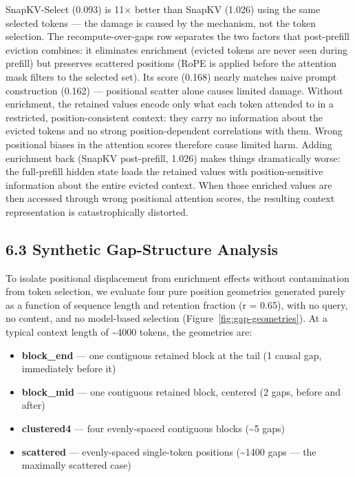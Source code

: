 \documentclass[10pt,letterpaper]{article}
\providecommand{\tightlist}{%
  \setlength{\itemsep}{0pt}\setlength{\parskip}{0pt}}
\begin{document}
SnapKV-Select (0.093) is 11× better than SnapKV (1.026) using the same
selected tokens --- the damage is caused by the mechanism, not the token
selection. The recompute-over-gaps row separates the two factors that
post-prefill eviction combines: it eliminates enrichment (evicted tokens
are never seen during prefill) but preserves scattered positions (RoPE
is applied before the attention mask filters to the selected set). Its
score (0.168) nearly matches naive prompt construction (0.162) ---
positional scatter alone causes limited damage. Without enrichment, the
retained values encode only what each token attended to in a restricted,
position-consistent context: they carry no information about the evicted
tokens and no strong position-dependent correlations with them. Wrong
positional biases in the attention scores therefore cause limited harm.
Adding enrichment back (SnapKV post-prefill, 1.026) makes things
dramatically worse: the full-prefill hidden state loads the retained
values with position-sensitive information about the entire evicted
context. When those enriched values are then accessed through wrong
positional attention scores, the resulting context representation is
catastrophically distorted.

\hypertarget{synthetic-gap-structure-analysis}{%
\subsection{6.3 Synthetic Gap-Structure
Analysis}\label{synthetic-gap-structure-analysis}}

To isolate positional displacement from enrichment effects without
contamination from token selection, we evaluate four pure position
geometries generated purely as a function of sequence length and
retention fraction (r = 0.65), with no query, no content, and no
model-based selection (Figure~\ref{fig:gap-geometries}). At a typical
context length of \textasciitilde4000 tokens, the geometries are:

\begin{itemize}
\tightlist
\item
  \textbf{block\_end} --- one contiguous retained block at the tail (1
  causal gap, immediately before it)
\item
  \textbf{block\_mid} --- one contiguous retained block, centered (2
  gaps, before and after)
\item
  \textbf{clustered4} --- four evenly-spaced contiguous blocks
  (\textasciitilde5 gaps)
\item
  \textbf{scattered} --- evenly-spaced single-token positions
  (\textasciitilde1400 gaps --- the maximally scattered case)
\end{itemize}
\end{document}
